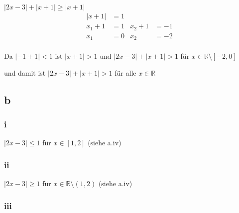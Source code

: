 \documentclass{article}
\begin{document}
$|2x-3|+|x+1|\geq |x+1|$
\begin{align*}
    |x+1|&=1\\
    x_1+1&=1&
    x_2+1&=-1\\
    x_1&=0&
    x_2&=-2\\
\end{align*}

Da $|-1+1|<1$ ist $|x+1|>1$ und $|2x-3|+|x+1|>1$ für 
$x\in \mathbb R\setminus [-2, 0]$

und damit ist $|2x-3|+|x+1|>1$ für alle $x\in\mathbb R$
\subsection*{b}
\subsubsection*{i}
$|2x-3|\leq 1$ für $x\in [1,2]$ (siehe a.iv)
\subsubsection*{ii}
$|2x-3|\geq 1$ für $x\in\mathbb R\setminus (1,2)$ (siehe a.iv)
\subsubsection*{iii}
\end{document}
